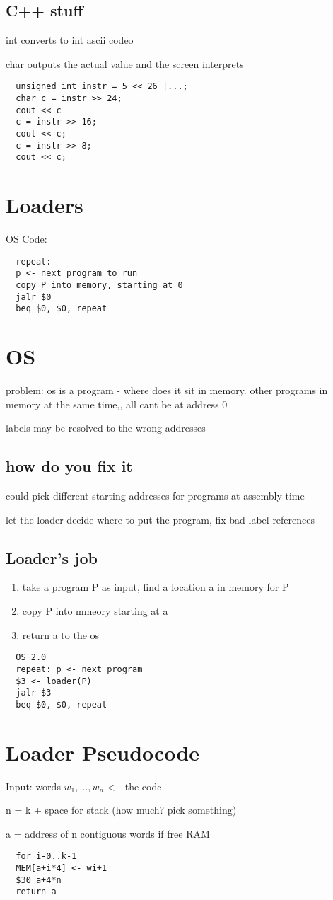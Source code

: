 \documentclass[11pt]{amsart}
\begin{document}
\subsection{C++ stuff}
\par int converts to int ascii codeo
\par char outputs the actual value and the screen interprets
\begin{verbatim}
  unsigned int instr = 5 << 26 |...;
  char c = instr >> 24;
  cout << c
  c = instr >> 16;
  cout << c;
  c = instr >> 8;
  cout << c;
\end{verbatim}
\section{Loaders}
\par OS Code:
\begin{verbatim}
  repeat:
  p <- next program to run
  copy P into memory, starting at 0
  jalr $0
  beq $0, $0, repeat
\end{verbatim}
\section{OS}
\par problem: os is a program - where does it sit in memory. other programs in
memory at the same time,, all cant be at address 0
\par labels may be resolved to the wrong addresses
\subsection{how do you fix it}
\par could pick different starting addresses for programs at assembly time
\par let the loader decide where to put the program, fix bad label references
\subsection{Loader's job}
\begin{enumerate}
  \item take a program P as input, find a location a in memory for P
  \item copy P into mmeory starting at a
  \item return a to the os
\end{enumerate}
\begin{verbatim}
  OS 2.0
  repeat: p <- next program
  $3 <- loader(P)
  jalr $3
  beq $0, $0, repeat
\end{verbatim}
\section{Loader Pseudocode}
\par Input: words $w_1 , \dots, w_n$ < - the code
\par n = k + space for stack (how much? pick something)
\par a = address of n contiguous words if free RAM
\begin{verbatim}
  for i-0..k-1
  MEM[a+i*4] <- wi+1
  $30 a+4*n
  return a
\end {verbatim}

\end{document}
